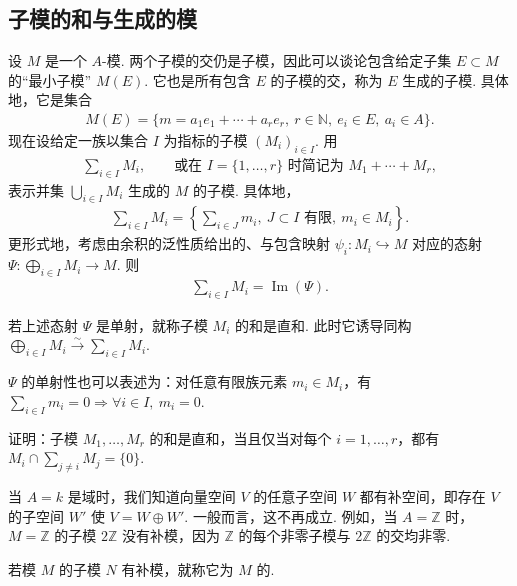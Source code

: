 \subsection{子模的和与生成的模}\label{sec:galois-1-3-5}
设 $M$ 是一个 $A$-模. 两个子模的交仍是子模，因此可以谈论包含给定子集 $E\subset M$ 的``最小子模'' $M(E)$. 它也是所有包含 $E$ 的子模的交，称为 $E$ 生成的子模. 具体地，它是集合
\begin{align*}
M(E)=\{m=a_1e_1+\cdots+a_re_r,\ r\in\mathbb N,\ e_i\in E,\ a_i\in A\}.
\end{align*}
现在设给定一族以集合 $I$ 为指标的子模 $(M_i)_{i\in I}$. 用
\begin{align*}
\sum_{i\in I}M_i,\qquad\text{或在 $I=\{1,\ldots,r\}$ 时简记为 }M_1+\cdots+M_r,
\end{align*}
表示并集 $\bigcup_{i\in I}M_i$ 生成的 $M$ 的子模. 具体地，
\begin{align*}
\sum_{i\in I}M_i=\left\{\sum_{i\in J}m_i,\ J\subset I\text{ 有限},\ m_i\in M_i\right\}.
\end{align*}
更形式地，考虑由余积的泛性质给出的、与包含映射 $\psi_i\colon M_i\hookrightarrow M$ 对应的态射 $\Psi\colon\bigoplus_{i\in I}M_i\longrightarrow M$. 则
\begin{align*}
\sum_{i\in I}M_i=\operatorname{Im}(\Psi).
\end{align*}
\begin{definition*}
若上述态射 $\Psi$ 是单射，就称子模 $M_i$ 的和是直和. 此时它诱导同构 $\bigoplus_{i\in I}M_i\xrightarrow{\sim}\sum_{i\in I}M_i$.
\end{definition*}
$\Psi$ 的单射性也可以表述为：对任意有限族元素 $m_i\in M_i$，有 $\sum_{i\in I}m_i=0\Rightarrow\forall i\in I,\ m_i=0$.
\begin{exercise*}
证明：子模 $M_1,\ldots,M_r$ 的和是直和，当且仅当对每个 $i=1,\ldots,r$，都有 $M_i\cap\sum_{j\ne i}M_j=\{0\}$.
\end{exercise*}
\begin{remark*}
当 $A=k$ 是域时，我们知道向量空间 $V$ 的任意子空间 $W$ 都有补空间，即存在 $V$ 的子空间 $W'$ 使 $V=W\oplus W'$. 一般而言，这不再成立. 例如，当 $A=\mathbb Z$ 时，$M=\mathbb Z$ 的子模 $2\mathbb Z$ 没有补模，因为 $\mathbb Z$ 的每个非零子模与 $2\mathbb Z$ 的交均非零.
\end{remark*}
若模 $M$ 的子模 $N$ 有补模，就称它为 $M$ 的.

